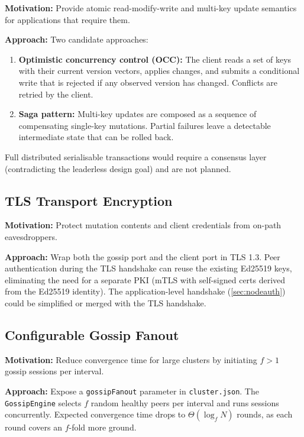 \textbf{Motivation:} Provide atomic read-modify-write and multi-key update
semantics for applications that require them.

\textbf{Approach:} Two candidate approaches:
\begin{enumerate}[leftmargin=1.5em]
  \item \textbf{Optimistic concurrency control (OCC):} The client reads a set
        of keys with their current version vectors, applies changes, and submits
        a conditional write that is rejected if any observed version has changed.
        Conflicts are retried by the client.
  \item \textbf{Saga pattern:} Multi-key updates are composed as a sequence of
        compensating single-key mutations. Partial failures leave a detectable
        intermediate state that can be rolled back.
\end{enumerate}
Full distributed serialisable transactions would require a consensus layer
(contradicting the leaderless design goal) and are not planned.

\subsection{TLS Transport Encryption}

\textbf{Motivation:} Protect mutation contents and client credentials from
on-path eavesdroppers.

\textbf{Approach:} Wrap both the gossip port and the client port in TLS 1.3.
Peer authentication during the TLS handshake can reuse the existing Ed25519
keys, eliminating the need for a separate PKI (mTLS with self-signed certs
derived from the Ed25519 identity). The application-level handshake
(\cref{sec:nodeauth}) could be simplified or merged with the TLS handshake.

\subsection{Configurable Gossip Fanout}

\textbf{Motivation:} Reduce convergence time for large clusters by initiating
$f > 1$ gossip sessions per interval.

\textbf{Approach:} Expose a \texttt{gossipFanout} parameter in
\texttt{cluster.json}. The \texttt{GossipEngine} selects $f$ random healthy
peers per interval and runs sessions concurrently. Expected convergence time
drops to $\Theta(\log_f N)$ rounds, as each round covers an $f$-fold more ground.

